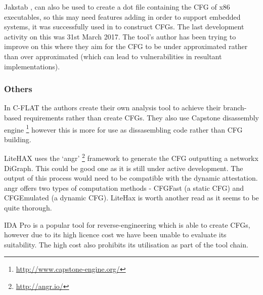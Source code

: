 Jakstab \cite{Kinder2008},\cite{Kinder2010} can also be used to create a dot file containing the CFG of x86 executables, so this may need features adding in order to support embedded systems, it was successfully used in \cite{Nguyen2013} to construct CFGs. The last development activity on this was 31st March 2017. The tool's author has been trying to improve on this where they aim for the CFG to be under approximated \cite{Kinder2012} rather than over approximated (which can lead to vulnerabilities in resultant implementations).

\subsubsection{Others}

In C-FLAT \cite{Abera2016} the authors create their own analysis tool to achieve their branch-based requirements rather than create CFGs. They also use Capstone disassembly engine \footnote{\url{http://www.capstone-engine.org/}} however this is more for use as dissasembling code rather than CFG building.

LiteHAX \cite{Dessouky2018} uses the `angr' \footnote{\url{http://angr.io/}} \cite{Shoshitaishvili2016} framework to generate the CFG outputting a networkx DiGraph. This could be good one as it is still under active development. The output of this process would need to be compatible with the dynamic attestation. angr offers two types of computation methods - CFGFast (a static CFG) and CFGEmulated (a dynamic CFG). LiteHax is worth another read as it seems to be quite thorough.

IDA Pro is a popular tool for reverse-engineering which is able to create CFGs, however due to its high licence cost we have been unable to evaluate its suitability. The high cost also prohibits its utilisation as part of the tool chain.